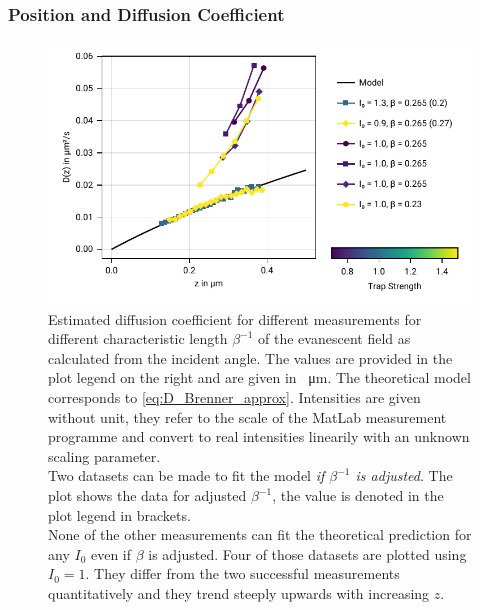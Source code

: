 \documentclass[
    twoside=false,
    twocolumn=true,
    fontsize=11pt,
]{scrarticle}
\begin{document}
\subsubsection*{Position and Diffusion Coefficient}
\begin{figure}
    \centering
    \includegraphics{figures/02_04_01_diffusion.pdf}
    \caption{Estimated diffusion coefficient for different measurements for different characteristic length $\beta^{-1}$ of the evanescent field as calculated from the incident angle. The values are provided in the plot legend on the right and are given in \SI{}{\micro m}. The theoretical model corresponds to \autoref{eq:D_Brenner_approx}. Intensities are given without unit, they refer to the scale of the MatLab measurement programme and convert to real intensities linearily with an unknown scaling parameter.\\
    Two datasets can be made to fit the model \textit{if $\beta^{-1}$ is adjusted}. The plot shows the data for adjusted $\beta^{-1}$, the value is denoted in the plot legend in brackets.\\
    None of the other measurements can fit the theoretical prediction for any $I_0$ even if $\beta$ is adjusted. Four of those datasets are plotted using $I_0=1$. They differ from the two successful measurements quantitatively and they trend steeply upwards with increasing $z$.}
    \label{fig:D_of_z}
\end{figure}
\end{document}
